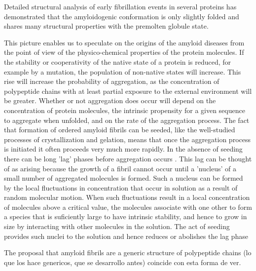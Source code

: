 Detailed structural analysis of early fibrillation events in several proteins has demonstrated that the amyloidogenic conformation is only slightly folded and shares many structural properties with the premolten globule state.

This picture enables us to speculate on the origins of the amyloid diseases from the point of view of the physico-chemical properties of the protein molecules. 
If the stability or cooperativity of the native state of a protein is reduced, for example by a mutation, the population of non-native states will increase.
This rise will increase the probability of aggregation, as the concentration of polypeptide chains with at least partial exposure to the external environment will be greater. Whether or not aggregation does occur will depend on
the concentration of protein molecules, the intrinsic propensity for a given sequence to aggregate when unfolded, and on the rate of the aggregation process. The
fact that formation of ordered amyloid fibrils can be seeded, like the well-studied processes of crystallization
and gelation, means that once the aggregation process is initiated it often proceeds very much more rapidly.
In the absence of seeding there can be long 'lag' phases before aggregation occurs . This lag can be thought of as arising because the growth of a fibril cannot occur until a 'nucleus' of a small number
of aggregated molecules is formed. Such a nucleus can be formed by the local fluctuations in concentration that occur in solution as a result of random molecular motion. When such fluctuations result in a local concentration of
molecules above a critical value, the molecules associate with one other to form a species that is suficiently large to have intrinsic stability, and hence to grow in size by interacting with other molecules in the solution. The act
of seeding provides such nuclei to the solution and hence reduces or abolishes the lag phase

The proposal that amyloid fibrils are a generic structure of polypeptide chains (lo que los hace genericos, que se desarrollo antes) coincide con esta forma de ver.









